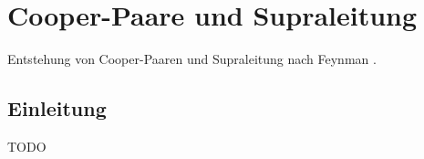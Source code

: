 \chapter{Cooper-Paare und Supraleitung\label{chapter:supraleitung}}
\begin{refsection}


Entstehung von Cooper-Paaren und Supraleitung nach Feynman
\cite{supraleitung:feynman}.


\newpage
\section{Einleitung}
TODO


\end{refsection}
